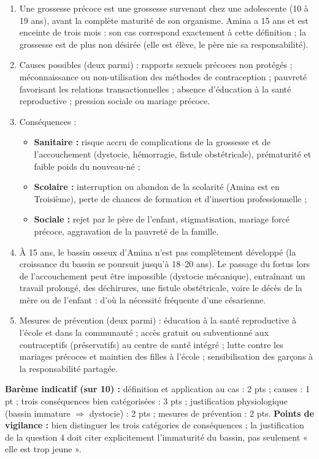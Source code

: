 \documentclass[11pt]{article}
\newcommand{\cle}[1]{{\popxbold\color{popdark}#1}}
\begin{document}
\begin{corrige}
\begin{enumerate}
\item Une \cle{grossesse précoce} est une grossesse survenant chez une adolescente (10 à 19 ans), avant la complète maturité de son organisme. Amina a 15 ans et est enceinte de trois mois : son cas correspond exactement à cette définition ; la grossesse est de plus non désirée (elle est élève, le père nie sa responsabilité).
\item Causes possibles (deux parmi) : rapports sexuels précoces non protégés ; méconnaissance ou non-utilisation des méthodes de contraception ; pauvreté favorisant les relations transactionnelles ; absence d'éducation à la santé reproductive ; pression sociale ou mariage précoce.
\item Conséquences :
\begin{itemize}
\item \textbf{Sanitaire :} risque accru de complications de la grossesse et de l'accouchement (dystocie, hémorragie, fistule obstétricale), prématurité et faible poids du nouveau-né ;
\item \textbf{Scolaire :} interruption ou abandon de la scolarité (Amina est en Troisième), perte de chances de formation et d'insertion professionnelle ;
\item \textbf{Sociale :} rejet par le père de l'enfant, stigmatisation, mariage forcé précoce, aggravation de la pauvreté de la famille.
\end{itemize}
\item À 15 ans, le bassin osseux d'Amina n'est pas complètement développé (la croissance du bassin se poursuit jusqu'à 18--20 ans). Le passage du f\oe{}tus lors de l'accouchement peut être impossible (dystocie mécanique), entraînant un travail prolongé, des déchirures, une fistule obstétricale, voire le décès de la mère ou de l'enfant : d'où la nécessité fréquente d'une césarienne.
\item Mesures de prévention (deux parmi) : éducation à la santé reproductive à l'école et dans la communauté ; accès gratuit ou subventionné aux contraceptifs (préservatifs) au centre de santé intégré ; lutte contre les mariages précoces et maintien des filles à l'école ; sensibilisation des garçons à la responsabilité partagée.
\end{enumerate}
\textbf{Barème indicatif (sur 10) :} définition et application au cas : 2 pts ; causes : 1 pt ; trois conséquences bien catégorisées : 3 pts ; justification physiologique (bassin immature $\Rightarrow$ dystocie) : 2 pts ; mesures de prévention : 2 pts.
\textbf{Points de vigilance :} bien distinguer les trois catégories de conséquences ; la justification de la question 4 doit citer explicitement l'immaturité du bassin, pas seulement « elle est trop jeune ».
\end{corrige}
\end{document}
